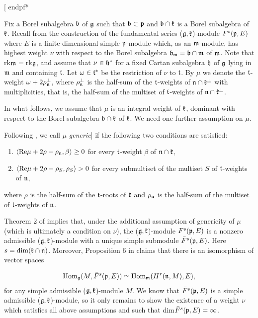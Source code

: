 \documentclass[12pt]{amsart}
\makeatletter
\def\mathfrak{\frak}
\newenvironment{proof}{%
         \@ifnextchar[{%
                       \expandafter\let\expandafter\end@proof
                         \csname endpf*\endcsname
                         \my@proof
                      }{\let\end@proof\endpf\pf}%
        }{\end@proof}
\def\my@proof[#1]{\@nameuse{pf*}{#1}}
\def\emph#1{{\em #1}}
\def\@putname#1#2#3#4{\def\@@ref{#3}\let\old@bf\bf
        \def\bf##1{\old@bf\if?\noexpand##1?{#4}\else##1\fi}%
        #1{#2}%
        \let\bf\old@bf}
\def\@putname#1#2#3#4{\def\@@ref{#3}\let\old@bf\bf    %
        \let\old@reset@font\reset@font                  %
        \def\bf##1{\old@bf\if?\noexpand##1?{#4}\else##1\fi}%
        \def\reset@font##1##2{\old@reset@font##1\if?\noexpand##2?{#4}\else##2\fi}#1{#2}%
        \let\bf\old@bf\let\reset@font\old@reset@font}
\let\my@cite=\cite
\def\cite#1{\@putname\my@cite{#1}{\@citeb}{\tiny\rm\@@ref}}
\theoremstyle{plain} %
\let\emphOrig\emph
\def\eatToBar#1|{}
\def\emphToIndexSLASH#1\/{\index{#1}\eatToBar}
\def\emphToIndexDOTSLASH#1.\/{\emphToIndexSLASH #1\/}
\def\emphAndIndex#1{\emphOrig{#1}{\emphToIndexDOTSLASH #1.\/|}}
\let\emph\emphAndIndex
\numberwithin{equation}{section}
\theoremstyle{definition}
\theoremstyle{remark}
\theoremstyle{plain} %
\newcommand{\fg}{\mathfrak{g}}
\newcommand{\fk}{\mathfrak{k}}
\newcommand{\fn}{\mathfrak{n}}
\newcommand{\fb}{\mathfrak{b}}
\newcommand{\fh}{\mathfrak{h}}
\makeatother
\begin{document}
\begin{proof}
Fix a Borel subalgebra $\fb$ of $\fg$ such that $\fb\subset\mathfrak{p}$ and $\fb\cap\fk$ is a Borel subalgebra of $\fk$. Recall from \cite{PZ1} the construction of the fundamental series ($\fg,\fk$)-module $F^s(\mathfrak{p}, E)$ where $E$ is a finite-dimensional simple $\mathfrak{p}$-module which, as an $\mathfrak{m}$-module, has highest weight $\nu$ with respect to the Borel subalgebra $\fb_{\mathfrak{m}}=\fb\cap\mathfrak{m}$ of $\mathfrak{m}$. Note that rk$\mathfrak{m}$$=$rk$\mathfrak{g}$, and assume that $\nu\in\fh^*$ for a fixed Cartan subalgebra $\fh$ of $\fg$ lying in $\mathfrak{m}$ and containing $\mathfrak{t}$. Let $\omega\in \mathfrak{t}^*$ be the restriction of $\nu$ to $\mathfrak{t}$. By $\mu$ we denote the $\mathfrak{t}$-weight $\omega+2\rho^{\perp}_{\fn}$, where $\rho^{\perp}_{\fn}$ is the half-sum of the $\mathfrak{t}$-weights of $\fn\cap\mathfrak{k}^{\perp}$ with multiplicities, that is, the half-sum of the multiset of $\mathfrak{t}$-weights of $\fn\cap\mathfrak{k}^{\perp}$.


In what follows, we assume that $\mu$ is an integral weight of $\mathfrak{k}$, dominant with respect to the Borel subalgebra $\fb\cap\mathfrak{k}$ of $\fk$. We need one further assumption on $\mu$.

Following \cite{PZ1}, we call $\mu$ \emph{generic} if the following two conditions are satisfied:

\begin{enumerate}
\item $\langle \textup{Re}\mu +2\rho-\rho_{\fn}, \beta\rangle\geq 0$ for every $\mathfrak{t}$-weight $\beta$ of $\fn\cap\mathfrak{k}$,
\item $\langle \textup{Re}\mu +2\rho-\rho_{S}, \rho_{S}\rangle>0$ for every submultiset of the multiset $S$ of $\mathfrak{t}$-weights of $\fn$,
\end{enumerate}
where $\rho$ is the half-sum of the $\mathfrak{t}$-roots of $\mathfrak{k}$ and $\rho_{\fn}$ is the half-sum of the multiset of $\mathfrak{t}$-weights of $\fn$.

Theorem 2 of \cite{PZ1} implies that, under the additional assumption of genericity of $\mu$ (which is ultimately a condition on $\nu$), the ($\fg,\fk$)-module $F^s(\mathfrak{p},E)$ is a nonzero admissible ($\fg,\fk$)-module with a unique simple submodule $\bar{F}^s(\mathfrak{p},E)$. Here $s=\textup{dim}(\fk\cap\fn)$. Moreover,  Proposition 6 in \cite{PZ1} claims  that there is an isomorphism of vector spaces

$$\textup{Hom}_\fg(M,\bar{F}^s(\mathfrak{p},E))\simeq\textup{Hom}_{\mathfrak{m}}(H^r(\fn,M),E),$$
for any simple admissible ($\fg,\fk$)-module $M$. We know that  	 $\bar{F}^s(\mathfrak{p},E)$ is a simple admissible  ($\fg,\fk$)-module, so it only remains to show the existence of a weight $\nu$ which satisfies all above assumptions and such that dim$\bar{F}^s(\mathfrak{p},E)=\infty$.


\end{proof}
\end{document}
